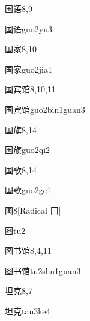 \begin{entry}{国语}{8,9}
  \begin{phonetics}{国语}{guo2yu3}
  \end{phonetics}
\end{entry}

\begin{entry}{国家}{8,10}
  \begin{phonetics}{国家}{guo2jia1}
  \end{phonetics}
\end{entry}

\begin{entry}{国宾馆}{8,10,11}
  \begin{phonetics}{国宾馆}{guo2bin1guan3}
  \end{phonetics}
\end{entry}

\begin{entry}{国旗}{8,14}
  \begin{phonetics}{国旗}{guo2qi2}
  \end{phonetics}
\end{entry}

\begin{entry}{国歌}{8,14}
  \begin{phonetics}{国歌}{guo2ge1}
  \end{phonetics}
\end{entry}

\begin{entry}{图}{8}[Radical 囗]
  \begin{phonetics}{图}{tu2}
  \end{phonetics}
\end{entry}

\begin{entry}{图书馆}{8,4,11}
  \begin{phonetics}{图书馆}{tu2shu1guan3}
  \end{phonetics}
\end{entry}

\begin{entry}{坦克}{8,7}
  \begin{phonetics}{坦克}{tan3ke4}
  \end{phonetics}
\end{entry}

